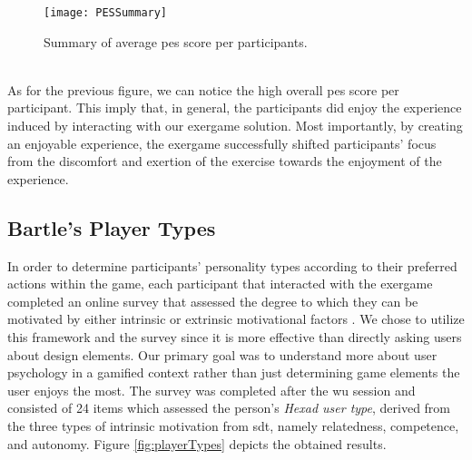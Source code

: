 \begin{figure}[h]
    \centering
    \texttt{[image: PESSummary]}
    \caption{Summary of average \acrshort{pes} score per participants.}
    \label{fig:pes}
\end{figure}\\
As for the previous figure, we can notice the high overall \acrshort{pes} score per participant. This imply that, in general, the participants did enjoy the experience induced by interacting with our exergame solution. Most importantly, by creating an enjoyable experience,  the exergame successfully shifted participants' focus from the discomfort and exertion of the exercise towards the enjoyment of the experience. 
\subsection{Bartle's Player Types}
In order to determine participants' personality types according to their preferred actions within the game, each participant that interacted with the exergame completed an online survey that assessed the degree to which they can be motivated by either intrinsic or extrinsic motivational factors \cite{tondello2016gamification}. We chose to utilize this framework and the survey since it is more effective than directly asking users about design elements. Our primary goal was to understand more about user psychology in a gamified context rather than just determining game elements the user enjoys the most. The survey was completed after the \acrshort{wu} session and consisted of 24 items which assessed the person's \textit{Hexad user type}, derived from the three types of intrinsic motivation from \acrshort{sdt}, namely relatedness, competence, and autonomy. Figure \ref{fig:playerTypes} depicts the obtained results. 
